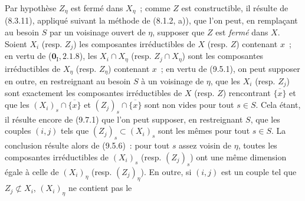 Par hypothèse $Z_\eta$ est fermé dans $X_\eta$~; comme $Z$ est constructible,
il résulte de (8.3.11), appliqué suivant la méthode de (8.1.2, a)), que l'on
peut, en remplaçant au besoin $S$ par un voisinage ouvert de $\eta$, supposer
que $Z$ est \emph{fermé} dans $X$. Soient $X_i$ (resp. $Z_j$) les composantes
irréductibles de $X$ (resp. $Z$) contenant $x$~; en vertu de
($\mathbf 0_{\mathrm I},2.1.8$), les $X_i\cap X_\eta$ (resp.
$Z_j\cap X_\eta$) sont les composantes irréductibles de $X_\eta$ (resp.
$Z_\eta$) contenant $x$~; en vertu de (9.5.1), on peut supposer en outre, en
restreignant au besoin $S$ à un voisinage de $\eta$, que les $X_i$ (resp.
$Z_j$) sont exactement les composantes irréductibles de $X$ (resp. $Z$)
rencontrant $\overline{\{x\}}$ et que les
$(X_i)_s\cap\overline{\{x\}}$ et $(Z_j)_s\cap\overline{\{x\}}$ sont non vides
pour tout $s\in S$. Cela étant, il résulte encore de (9.7.1) que l'on peut
supposer, en restreignant $S$, que les couples $(i,j)$ tels que
$(Z_j)_s\subset(X_i)_s$ sont les mêmes pour tout $s\in S$. La conclusion
résulte alors de (9.5.6)~: pour tout $s$ assez voisin de $\eta$, toutes les
composantes irréductibles de $(X_i)_s$ (resp. $(Z_j)_s$) ont une même dimension
égale à celle de $(X_i)_\eta$ (resp. $(Z_j)_\eta$). En outre, si $(i,j)$ est un
couple tel que $Z_j\not\subset X_i$, $(X_i)_\eta$ ne contient pas le

